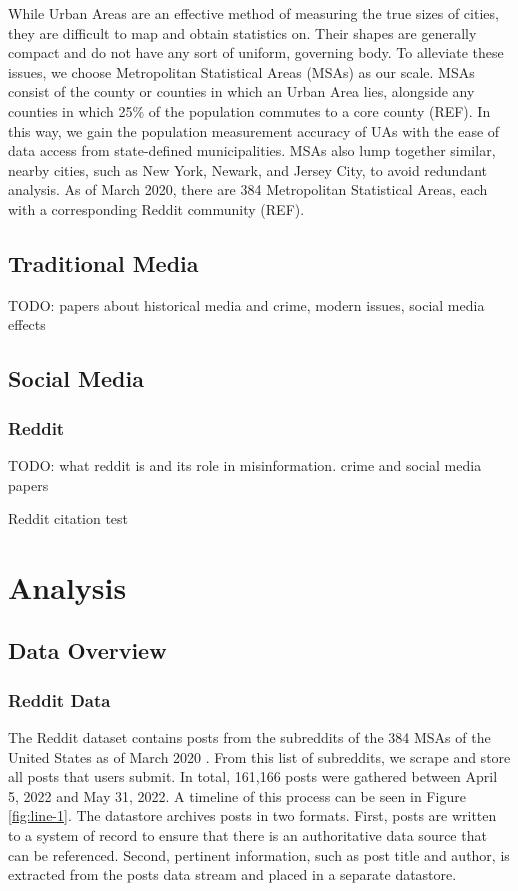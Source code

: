 \documentclass[12pt,oneside, letterpaper]{book}
\begin{document}
\par While Urban Areas are an effective method of measuring the true sizes of cities, they are difficult to map and obtain statistics on. Their shapes are generally compact and do not have any sort of uniform, governing body. To alleviate these issues, we choose Metropolitan Statistical Areas (MSAs) as our scale. MSAs consist of the county or counties in which an Urban Area lies, alongside any counties in which 25\% of the population commutes to a core county (REF). In this way, we gain the population measurement accuracy of UAs with the ease of data access from state-defined municipalities. MSAs also lump together similar, nearby cities, such as New York, Newark, and Jersey City, to avoid redundant analysis. As of March 2020, there are 384 Metropolitan Statistical Areas, each with a corresponding Reddit community (REF).

\section{Traditional Media}
\par TODO: papers about historical media and crime, modern issues, social media effects

\section{Social Media}

\subsection{Reddit}

\par TODO: what reddit is and its role in misinformation. crime and social media papers

\par Reddit citation test \cite{ftahmsabi}

\chapter{Analysis}

\section{Data Overview}

\subsection{Reddit Data}
\par The Reddit dataset contains posts from the subreddits of the 384 MSAs of the United States as of March 2020 \cite{censusmetro}. From this list of subreddits, we scrape and store all posts that users submit. In total, 161,166 posts were gathered between April 5, 2022 and May 31, 2022. A timeline of this process can be seen in Figure \ref{fig:line-1}. The datastore archives posts in two formats. First, posts are written to a system of record to ensure that there is an authoritative data source that can be referenced. Second, pertinent information, such as post title and author, is extracted from the posts data stream and placed in a separate datastore.
\end{document}
